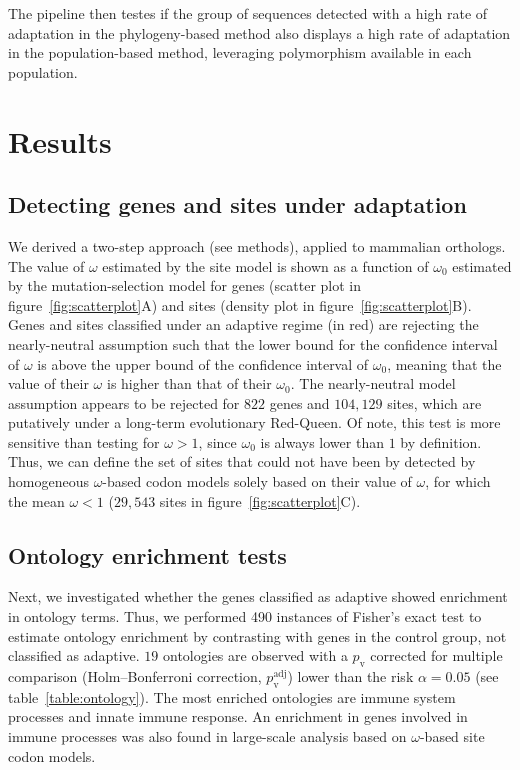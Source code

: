 \documentclass{article}
\begin{document}
    The pipeline then testes if the group of sequences detected with a high rate of adaptation in the phylogeny-based method also displays a high rate of adaptation in the population-based method, leveraging polymorphism available in each population.

    \section*{Results}\label{sec:results}

    \subsection*{Detecting genes and sites under adaptation}

    We derived a two-step approach (see methods), applied to mammalian orthologs.
    The value of $\omega$ estimated by the site model is shown as a function of $\omega_{0}$ estimated by the mutation-selection model for genes (scatter plot in figure~\ref{fig:scatterplot}A) and sites (density plot in figure~\ref{fig:scatterplot}B).
    Genes and sites classified under an adaptive regime (in red) are rejecting the nearly-neutral assumption such that the lower bound for the confidence interval of $\omega$ is above the upper bound of the confidence interval of $\omega_{0}$, meaning that the value of their $\omega$ is higher than that of their $\omega_{0}$.
    The nearly-neutral model assumption appears to be rejected for $822$ genes and $104,129$ sites, which are putatively under a long-term evolutionary Red-Queen.
    Of note, this test is more sensitive than testing for $\omega>1$, since $\omega_{0}$ is always lower than $1$ by definition\cite{spielman_relationship_2015}.
    Thus, we can define the set of sites that could not have been by detected by homogeneous $\omega$-based codon models solely based on their value of $\omega$, for which the mean $\omega < 1 $ ($29,543$ sites in figure~\ref{fig:scatterplot}C).

    \subsection*{Ontology enrichment tests}

    Next, we investigated whether the genes classified as adaptive showed enrichment in ontology terms.
    Thus, we performed 490 instances of Fisher's exact test to estimate ontology enrichment by contrasting with genes in the control group, not classified as adaptive.
    $19$ ontologies are observed with a $p_{\mathrm{v}}$ corrected for multiple comparison (Holm–Bonferroni correction, $p_{\mathrm{v}}^{\mathrm{adj}}$) lower than the risk $\alpha=0.05$ (see table~\ref{table:ontology}).
    The most enriched ontologies are immune system processes and innate immune response.
    An enrichment in genes involved in immune processes was also found in large-scale analysis based on $\omega$-based site codon models\cite{kosiol_patterns_2008}.
\end{document}
